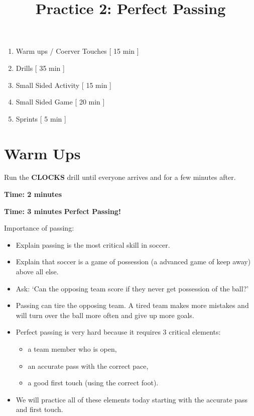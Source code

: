 \documentclass[10pt,letterpaper]{article}
\title{\vspace{-.5in}Practice 2: Perfect Passing}
\author{\vspace{-.5in}}
\date{\vspace{-.5in}}
\newenvironment{agendablock}[1]{%
    \tcolorbox[beamer,%
    noparskip,breakable,
    colback=LightGray,colframe=Black,%
    colbacklower=Gray!75!LightGray,%
    title=#1]}%
    {\endtcolorbox}
\newenvironment{myalertblock}[1]{%
    \tcolorbox[beamer,%
    noparskip,breakable,
    colback=LightCoral,colframe=DarkRed,%
    colbacklower=Tomato!75!LightCoral,%
    title=#1]}%
    {\endtcolorbox}
\begin{document}
\selectfont


\maketitle

\begin{agendablock}{Practice Activities}
    \begin{enumerate}
        \item Warm ups / Coerver Touches [ 15 min ]
        \item Drills [ 35 min ]
        \item Small Sided Activity [ 15 min ]
        \item Small Sided Game [ 20 min ]
        \item Sprints [ 5 min ] 
    \end{enumerate}
\end{agendablock}

\section{Warm Ups}
Run the \textbf{CLOCKS} drill until everyone arrives and for a few minutes after.

\textbf{Time: 2 minutes}


\textbf{Time: 3 minutes}
\begin{myalertblock}{Theme of the Practice}
    \textbf{Perfect Passing!}

    Importance of passing:
    \begin{itemize}
        \setlength{\itemsep}{0pt}
        \setlength{\parskip}{0pt}
        \setlength{\parsep}{0pt}
        \item Explain passing is the most critical skill in soccer.
        \item Explain that soccer is a game of possession (a advanced game of keep away) above all else.
        \item Ask: `Can the opposing team score if they never get possession of the ball?'
        \item Passing can tire the opposing team.  A tired team makes more mistakes and will turn over the ball more often and give up more goals.
        \item Perfect passing is very hard because it requires 3 critical elements:
        \begin{itemize}
            \setlength{\itemsep}{0pt}
            \setlength{\parskip}{0pt}
            \setlength{\parsep}{0pt}
            \item a team member who is open,
            \item an accurate pass with the correct pace,
            \item a good first touch (using the correct foot).
        \end{itemize}
        \item We will practice all of these elements today starting with the accurate pass and first touch.
    \end{itemize}
\end{myalertblock}
\end{document}
